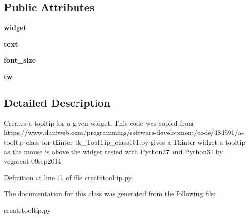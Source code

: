 \subsection*{Public Attributes}
\begin{DoxyCompactItemize}
\item 
{\bfseries widget}\hypertarget{classnegui_1_1createtooltip_1_1CreateToolTip_a6619448e568b135261fd02a6d9b36725}{}\label{classnegui_1_1createtooltip_1_1CreateToolTip_a6619448e568b135261fd02a6d9b36725}

\item 
{\bfseries text}\hypertarget{classnegui_1_1createtooltip_1_1CreateToolTip_a198b3395803def62ec55ed820e756b11}{}\label{classnegui_1_1createtooltip_1_1CreateToolTip_a198b3395803def62ec55ed820e756b11}

\item 
{\bfseries font\+\_\+size}\hypertarget{classnegui_1_1createtooltip_1_1CreateToolTip_a42f2306cb6ad9995d76e0eb556416bed}{}\label{classnegui_1_1createtooltip_1_1CreateToolTip_a42f2306cb6ad9995d76e0eb556416bed}

\item 
{\bfseries tw}\hypertarget{classnegui_1_1createtooltip_1_1CreateToolTip_ac47a0f82a5a354f6c8914c4631d1a0cf}{}\label{classnegui_1_1createtooltip_1_1CreateToolTip_ac47a0f82a5a354f6c8914c4631d1a0cf}

\end{DoxyCompactItemize}


\subsection{Detailed Description}
\begin{DoxyVerb}Creates a tooltip for a given widget.
This code was copied from 
https://www.daniweb.com/programming/software-development/code/484591/a-tooltip-class-for-tkinter
tk_ToolTip_class101.py
gives a Tkinter widget a tooltip as the mouse is above the widget
tested with Python27 and Python34  by  vegaseat  09sep2014\end{DoxyVerb}
 

Definition at line 41 of file createtooltip.\+py.



The documentation for this class was generated from the following file\+:\begin{DoxyCompactItemize}
\item 
createtooltip.\+py\end{DoxyCompactItemize}
